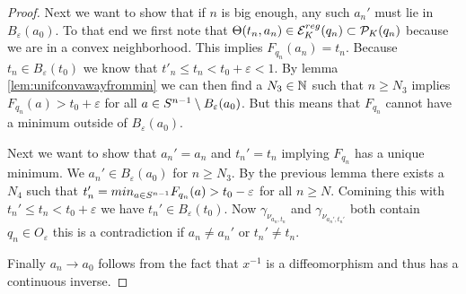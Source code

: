 \begin{proof}
    Next we want to show that if $n$ is big enough, any such $a_n'$ must lie in $B_\varepsilon(a_0)$. To that end we first note that  $\Theta(t_n,a_n)\in {{\mathcal{E}}^{reg}_K}(q_n)\subset {\mathcal{P}}_K(q_n)$ because we are in a convex neighborhood. This implies $F_{q_n}(a_n)=t_n$. Because $t_n\in B_\varepsilon(t_0)$ we know that $t'_n\leq t_n < t_0+\varepsilon < 1$. By lemma \ref{lem:unifconvawayfrommin} we can then find a $N_3\in \mathbb{N}$ such that $n\ge N_3$ implies $F_{q_n}(a)>t_0+\varepsilon$ for all $a\in {S^{n-1}} \setminus B_\varepsilon(a_0)$. But this means that $F_{q_n}$ cannot have a minimum outside of $B_\varepsilon(a_0)$.

    Next we want to show that $a_n'=a_n$ and $t_n'=t_n$ implying $F_{q_n}$ has a unique minimum.
    We $a_n'\in B_\varepsilon(a_0)$ for $n\ge N_3$. By the previous lemma there exists a $N_4$ such that $t'_n=min_{a\in {S^{n-1}}} F_{q_n}(a) > t_0-\varepsilon$ for all $n\ge N$. Comining this with $t_n'\leq t_n < t_0+\varepsilon$ we have $t_n'\in B_\varepsilon(t_0)$. Now $\gamma_{\nu_{a_n,t_n}}$ and $\gamma_{\nu_{a_n',t_n'}}$ both contain $q_n\in O_\varepsilon$ this is a contradiction if $a_n\neq a_n'$ or $t_n'\neq t_n$. 

    Finally $a_n\to a_0$ follows from the fact that $x^{-1}$ is a diffeomorphism and thus has a continuous inverse.
\end{proof}